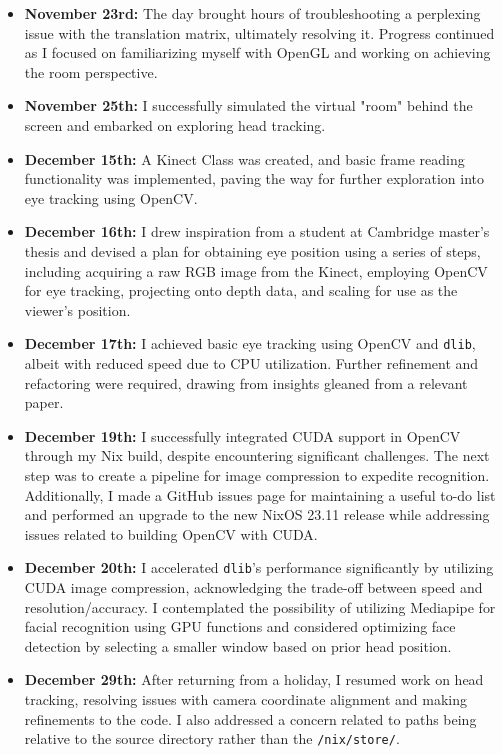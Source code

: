 \begin{itemize}
    \item \textbf{November 23rd:} The day brought hours of troubleshooting a perplexing issue with the translation matrix, ultimately resolving it. Progress continued as I focused on familiarizing myself with OpenGL and working on achieving the room perspective.

    \item \textbf{November 25th:} I successfully simulated the virtual "room" behind the screen and embarked on exploring head tracking.

    \item \textbf{December 15th:} A Kinect Class was created, and basic frame reading functionality was implemented, paving the way for further exploration into eye tracking using OpenCV.

    \item \textbf{December 16th:} I drew inspiration from a student at Cambridge master’s thesis \cite{Zabarauskas2012} and devised a plan for obtaining eye position using a series of steps, including acquiring a raw RGB image from the Kinect, employing OpenCV for eye tracking, projecting onto depth data, and scaling for use as the viewer's position.

    \item \textbf{December 17th:} I achieved basic eye tracking using OpenCV and \texttt{dlib}, albeit with reduced speed due to CPU utilization. Further refinement and refactoring were required, drawing from insights gleaned from a relevant paper.

    \item \textbf{December 19th:} I successfully integrated CUDA support in OpenCV through my Nix build, despite encountering significant challenges. The next step was to create a pipeline for image compression to expedite recognition. Additionally, I made a GitHub issues page for maintaining a useful to-do list and performed an upgrade to the new NixOS 23.11 release while addressing issues related to building OpenCV with CUDA.

    \item \textbf{December 20th:} I accelerated \texttt{dlib}'s performance significantly by utilizing CUDA image compression, acknowledging the trade-off between speed and resolution/accuracy. I contemplated the possibility of utilizing Mediapipe for facial recognition using GPU functions and considered optimizing face detection by selecting a smaller window based on prior head position.

    \item \textbf{December 29th:} After returning from a holiday, I resumed work on head tracking, resolving issues with camera coordinate alignment and making refinements to the code. I also addressed a concern related to paths being relative to the source directory rather than the \texttt{/nix/store/}.


\end{itemize}
